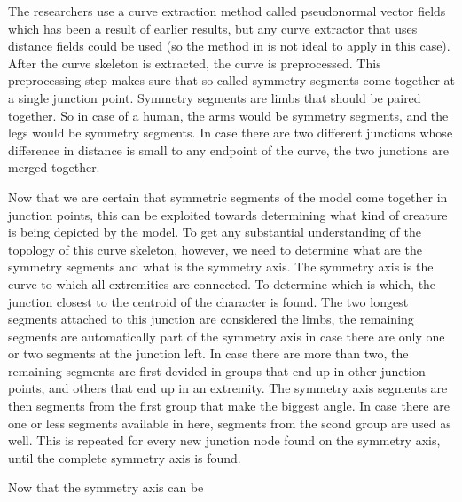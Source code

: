 \documentclass{article}
\begin{document}
The researchers use a curve extraction method called pseudonormal vector fields
which has been a result of earlier results, but any curve extractor that uses
distance fields could be used (so the method in \citep{paper2} is not ideal to
apply in this case). After the curve skeleton is extracted, the
curve is preprocessed. This preprocessing step makes sure that so called
symmetry segments come together at a single junction point. Symmetry segments
are limbs that should be paired together. So in case of a human, the arms would
be symmetry segments, and the legs would be symmetry segments. In case there are
two different junctions whose difference in distance is small to any endpoint of
the curve, the two junctions are merged together.

Now that we are certain that symmetric segments of the model come
together in junction points, this can be exploited towards determining what kind
of creature is being depicted by the model. To get any substantial understanding
of the topology of this curve skeleton, however, we need to determine what are
the symmetry segments and what is the symmetry axis. The symmetry axis is the
curve to which all extremities are connected. To determine which is which, the
junction closest to the centroid of the character is found. The two longest
segments attached to this junction are considered the limbs, the remaining
segments are automatically part of the symmetry axis in case there are only one
or two segments at the junction left. In case there are more than two, the
remaining segments are first devided in groups that end up in other junction
points, and others that end up in an extremity. The symmetry axis segments are
then segments from the first group that make the biggest angle. In case there
are one or less segments available in here, segments from the scond group are
used as well. This is repeated for every new junction node found on the symmetry
axis, until the complete symmetry axis is found.


Now that the symmetry axis can be 

 
\end{document}
